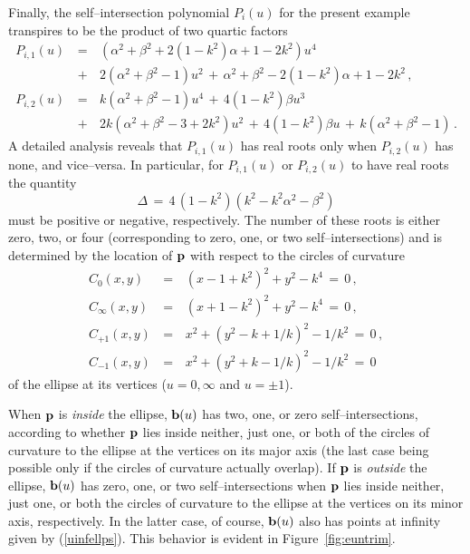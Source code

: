 Finally, the self--intersection polynomial $P_i(u)$ for the present
example transpires to be the product of two quartic factors
\begin{eqnarray} \label{Iellps}
P_{i,1}(u) &\,=\,&
(\alpha^2+\beta^2+2(1-k^2)\alpha+1-2k^2)u^4 \nonumber \\
&\,+\,& 2(\alpha^2+\beta^2-1)u^2 \,+\, \alpha^2+\beta^2
-2(1-k^2)\alpha+1-2k^2 \,, \\
P_{i,2}(u) &\,=\,&
k(\alpha^2+\beta^2-1)u^4 \,+\, 4(1-k^2)\beta u^3 \nonumber \\
&\,+\,& 2k(\alpha^2+\beta^2-3+2k^2)u^2
\,+\, 4(1-k^2)\beta u \,+\, k(\alpha^2+\beta^2-1) \,. \nonumber
\end{eqnarray}
A detailed analysis \cite{farouki91b} reveals that $P_{i,1}(u)$
has real roots only when $P_{i,2}(u)$ has none, and vice--versa.
In particular, for $P_{i,1}(u)$ or $P_{i,2}(u)$ to have real roots
the quantity
\begin{equation} \label{discrim1}
\Delta \,=\, 4\,(1-k^2)(k^2-k^2\alpha^2-\beta^2)
\end{equation}
must be positive or negative, respectively. The number of these
roots is either zero, two, or four (corresponding to zero, one,
or two self--intersections) and is determined by the location of
${\bf p}$ with respect to the circles of curvature
\begin{eqnarray} \label{ecircles}
C_0(x,y) &\,=\,& (x-1+k^2)^2 + y^2 - k^4 \,=\, 0 \,, \nonumber \\
C_\infty(x,y) &\,=\,& (x+1-k^2)^2 + y^2 - k^4 \,=\, 0 \,, \nonumber \\
C_{+1}(x,y) &\,=\,& x^2 + (y^2-k+1/k)^2 - 1/k^2 \,=\, 0 \,, \nonumber \\
C_{-1}(x,y) &\,=\,& x^2 + (y^2+k-1/k)^2 - 1/k^2 \,=\, 0
\end{eqnarray}
of the ellipse at its vertices ($u=0,\infty$ and $u=\pm 1$).

When ${\bf p}$ is {\it inside\/} the ellipse, ${\bf b}(u)$ has
two, one, or zero self--intersections, according to whether
${\bf p}$ lies inside neither, just one, or both of the circles
of curvature to the ellipse at the vertices on its major axis
(the last case being possible only if the circles of curvature
actually overlap). If ${\bf p}$ is {\it outside\/} the ellipse,
${\bf b}(u)$ has zero, one, or two self--intersections when
${\bf p}$ lies inside neither, just one, or both the circles
of curvature to the ellipse at the vertices on its minor axis,
respectively. In the latter case, of course, ${\bf b}(u)$ also
has points at infinity given by (\ref{uinfellps}). This behavior
is evident in Figure~\ref{fig:euntrim}.

